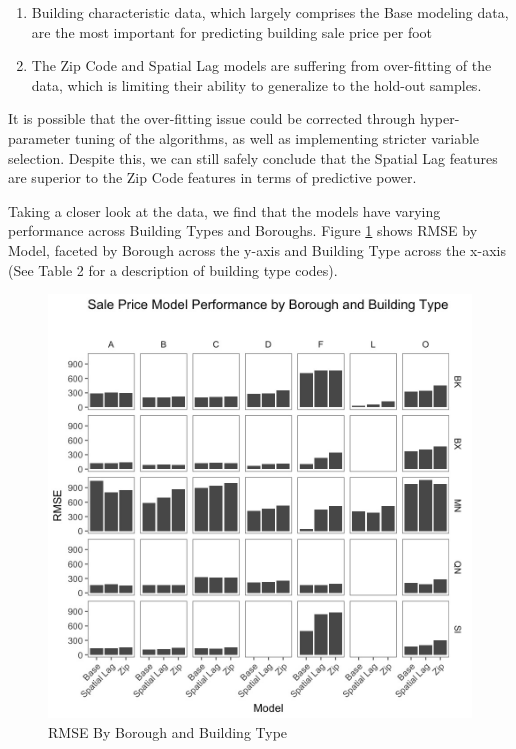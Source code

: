 \documentclass[12pt,]{article}
\providecommand{\tightlist}{%
  \setlength{\itemsep}{0pt}\setlength{\parskip}{0pt}}
\begin{document}
\begin{enumerate}
\def\labelenumi{\arabic{enumi})}
\tightlist
\item
  Building characteristic data, which largely comprises the Base
  modeling data, are the most important for predicting building sale
  price per foot
\item
  The Zip Code and Spatial Lag models are suffering from over-fitting of
  the data, which is limiting their ability to generalize to the
  hold-out samples.
\end{enumerate}

It is possible that the over-fitting issue could be corrected through
hyper-parameter tuning of the algorithms, as well as implementing
stricter variable selection. Despite this, we can still safely conclude
that the Spatial Lag features are superior to the Zip Code features in
terms of predictive power.

Taking a closer look at the data, we find that the models have varying
performance across Building Types and Boroughs. Figure
\ref{fig:RMSE by boro and build type} shows RMSE by Model, faceted by
Borough across the y-axis and Building Type across the x-axis (See Table
2 for a description of building type codes).

\begin{figure}[h]
\includegraphics[width=1\linewidth]{Sections/tables and figures/RMSE by boro and build type} \caption{RMSE By Borough and Building Type}\label{fig:RMSE by boro and build type}
\end{figure}
\end{document}
